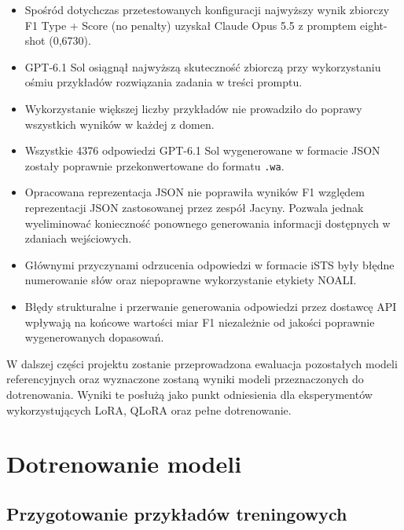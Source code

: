\documentclass[a4paper,10pt]{article}
\begin{document}
\begin{itemize}
    \item Spośród dotychczas przetestowanych konfiguracji
    najwyższy wynik zbiorczy F1 Type + Score
    (no penalty) uzyskał Claude Opus 5.5
    z promptem eight-shot (0,6730).

    \item GPT-6.1 Sol osiągnął najwyższą skuteczność
    zbiorczą przy wykorzystaniu ośmiu przykładów
    rozwiązania zadania w treści promptu.

    \item Wykorzystanie większej liczby przykładów
    nie prowadziło do poprawy wszystkich wyników
    w każdej z domen.

    \item Wszystkie 4376 odpowiedzi GPT-6.1 Sol
    wygenerowane w formacie JSON zostały poprawnie
    przekonwertowane do formatu \texttt{.wa}.

    \item Opracowana reprezentacja JSON nie poprawiła
    wyników F1 względem reprezentacji JSON zastosowanej
    przez zespół Jacyny. Pozwala jednak wyeliminować
    konieczność ponownego generowania informacji
    dostępnych w zdaniach wejściowych.

    \item Głównymi przyczynami odrzucenia odpowiedzi
    w formacie iSTS były błędne numerowanie słów
    oraz niepoprawne wykorzystanie etykiety NOALI.

    \item Błędy strukturalne i przerwanie generowania
    odpowiedzi przez dostawcę API wpływają na końcowe
    wartości miar F1 niezależnie od jakości poprawnie
    wygenerowanych dopasowań.
\end{itemize}

W dalszej części projektu zostanie przeprowadzona
ewaluacja pozostałych modeli referencyjnych oraz
wyznaczone zostaną wyniki modeli przeznaczonych
do dotrenowania. Wyniki te posłużą jako punkt
odniesienia dla eksperymentów wykorzystujących
LoRA, QLoRA oraz pełne dotrenowanie.  

\section{Dotrenowanie modeli}

\subsection{Przygotowanie przykładów treningowych}
\end{document}
